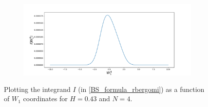 \documentclass[11pt]{article}
\begin{document}
\begin{figure}[h!]
\begin{subfigure}[b]{0.475\textwidth}
		\caption{}
		\label{fig:sub4}
	\end{subfigure}
	\quad
	\begin{subfigure}[b]{0.475\textwidth}
		\centering
		\includegraphics[width=1\linewidth]{./figures/integrand_plotting_rBergomi/1D_plots/N_4/H_043/Bergomi_integrand_K_1_H_043_W14_N_4}
		\caption{}
		\label{fig:sub4}
	\end{subfigure}
	\caption{Plotting the integrand $I$ (in \eqref{BS_formula_rbergomi}) as a function of $W_1$ coordinates for $H=0.43$ and $N=4$.}
	\label{fig:Integrand_H_043_N_4_W_1_1}
\end{figure}
\end{document}
